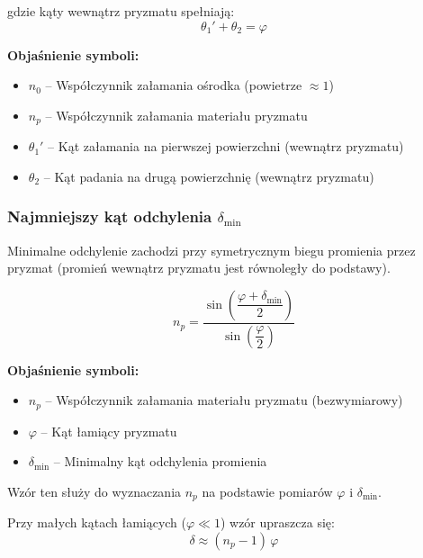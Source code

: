 \documentclass[12pt,a4paper]{article}
\newcommand{\oznaczenie}[2]{%
  \item $#1$ -- #2%
}
\begin{document}
gdzie kąty wewnątrz pryzmatu spełniają:
\begin{equation}
  \theta_1' + \theta_2 = \varphi
\end{equation}

\begin{objasnbox}
\textbf{Objaśnienie symboli:}
\begin{itemize}[leftmargin=2em]
  \oznaczenie{n_0}{Współczynnik załamania ośrodka (powietrze $\approx 1$)}
  \oznaczenie{n_p}{Współczynnik załamania materiału pryzmatu}
  \oznaczenie{\theta_1'}{Kąt załamania na pierwszej powierzchni (wewnątrz pryzmatu)}
  \oznaczenie{\theta_2}{Kąt padania na drugą powierzchnię (wewnątrz pryzmatu)}
\end{itemize}
\end{objasnbox}

\subsubsection{Najmniejszy kąt odchylenia $\delta_{\min}$}

Minimalne odchylenie zachodzi przy symetrycznym biegu promienia przez pryzmat
(promień wewnątrz pryzmatu jest równoległy do podstawy).

\begin{wzorbox}
\begin{equation}
  n_p = \frac{\sin\!\left(\dfrac{\varphi + \delta_{\min}}{2}\right)}
             {\sin\!\left(\dfrac{\varphi}{2}\right)}
  \label{eq:min_odchylenie}
\end{equation}
\end{wzorbox}

\begin{objasnbox}
\textbf{Objaśnienie symboli:}
\begin{itemize}[leftmargin=2em]
  \oznaczenie{n_p}{Współczynnik załamania materiału pryzmatu (bezwymiarowy)}
  \oznaczenie{\varphi}{Kąt łamiący pryzmatu \quad [°]}
  \oznaczenie{\delta_{\min}}{Minimalny kąt odchylenia promienia \quad [°]}
\end{itemize}
Wzór ten służy do wyznaczania $n_p$ na podstawie pomiarów $\varphi$ i $\delta_{\min}$.
\end{objasnbox}

Przy małych kątach łamiących ($\varphi \ll 1$) wzór upraszcza się:
\begin{equation}
  \delta \approx (n_p - 1)\,\varphi
  \label{eq:pryzmnat_male_katy}
\end{equation}

\end{document}
